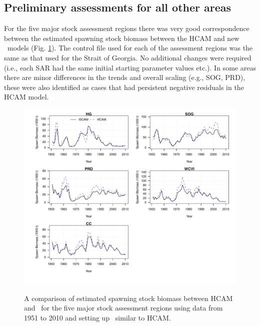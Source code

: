 	
	\subsection{Preliminary assessments for all other areas}
	For the five major stock assessment regions there was very good correspondence between the estimated spawning stock biomass between the HCAM and new \iscam\  models (Fig. \ref{fig:iSCAMvsHCAM}). The control file used for each of the assessment regions was the same as that used for the Strait of Georgia.  No additional changes were required (i.e., each SAR had the same initial starting parameter values etc.).  In some areas there are minor differences in the trends and overall scaling (e.g., SOG, PRD), these were also identified as cases that had persistent negative residuals in the HCAM model.

\begin{figure}[htbp]
	\centering
		\includegraphics[width=\textwidth]{../Figs/iscam_fig_SBt_iSCAMvsHCAM.pdf}\\
	\caption{A comparison of estimated spawning stock biomass between HCAM and \iscam\ for the five major stock assessment regions using data from 1951 to 2010 and setting up \iscam\ similar to HCAM.}
	\label{fig:iSCAMvsHCAM}
\end{figure}

\clearpage
